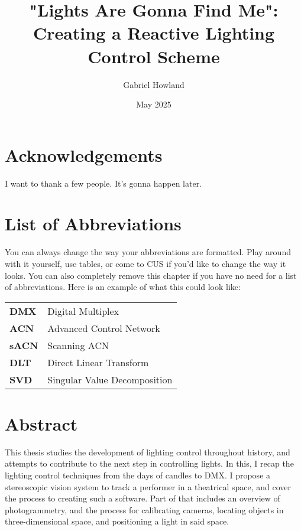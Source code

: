 \documentclass[
    12pt,
    twoside,
    bibstyle=chicago,
    headerstyle=uppercase,
	bibfile=biblatex_updating.bib
]{reedthesis}
\title{"Lights Are Gonna Find Me": Creating a Reactive Lighting Control Scheme}
\author{Gabriel Howland}
\date{May 2025}
\begin{document}
  \maketitle
  \frontmatter %
  \pagestyle{empty} %

    \chapter*{Acknowledgements}
	I want to thank a few people. It's gonna happen later.

	

    \chapter*{List of Abbreviations}
		You can always change the way your abbreviations are formatted. Play around with it yourself, use tables, or come to CUS if you'd like to change the way it looks. You can also completely remove this chapter if you have no need for a list of abbreviations. Here is an example of what this could look like:

	\begin{table}[h]
	\centering %
	\begin{tabular}{ll}
		\textbf{DMX}  	&  Digital Multiplex \\
		\textbf{ACN}		&  Advanced Control Network\\
		\textbf{sACN}  	&  Scanning ACN\\
		\textbf{DLT} 	&  Direct Linear Transform\\
		\textbf{SVD}		&  Singular Value Decomposition\\
	\end{tabular}
	\end{table}
	

    \tableofcontents
    \listoffigures


    \chapter*{Abstract}
	This thesis studies the development of lighting control throughout history, and attempts to contribute to the next step in controlling lights. In this, I recap the lighting control techniques from the days of candles to DMX. I propose a stereoscopic vision system to track a performer in a theatrical space, and cover the process to creating such a software. Part of that includes an overview of photogrammetry, and the process for calibrating cameras, locating objects in three-dimensional space, and positioning a light in said space.
	
\end{document}
